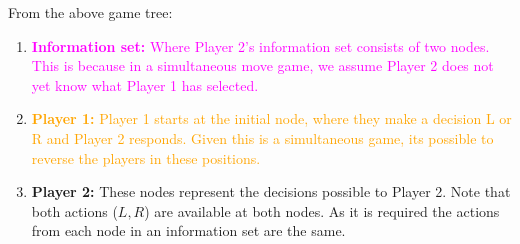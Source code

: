 \documentclass{article}
\begin{document}
\begin{center}
\end{center}

From the above game tree: 
\begin{enumerate}
    \item \textcolor{magenta}{\textbf{Information set:} Where Player 2's information set consists of two nodes. This is because in a simultaneous move game, we assume Player 2 does not yet know what Player 1 has selected.}
    \item \textcolor{orange}{\textbf{Player 1:} Player 1 starts at the initial node, where they make a decision L or R and Player 2 responds. Given this is a simultaneous game, its possible to reverse the players in these positions.}
    \item \textcolor{cyan!70!black}{\textbf{Player 2:} These nodes represent the decisions possible to Player 2. Note that both actions ($L, R$) are available at both nodes. As it is required the actions from each node in an information set are the same.}
\end{enumerate}
\end{document}
